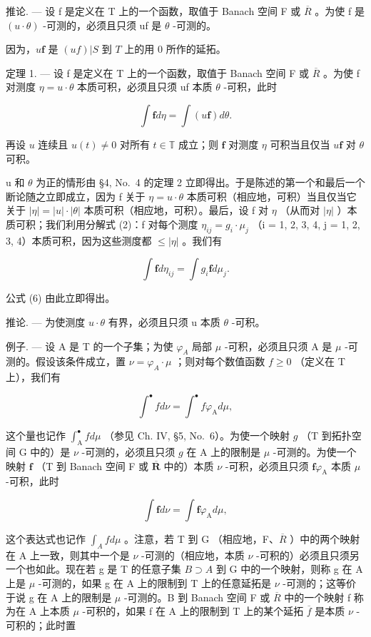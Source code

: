 推论. --- 设 f 是定义在 T 上的一个函数，取值于 Banach 空间 F 或 \(\overline{R}\) 。为使 f 是 \((u\cdot\theta)\) -可测的，必须且只须 uf 是 \(\theta\) -可测的。

因为，\(u\mathbf{f}\) 是 \((uf)|S\) 到 \(T\) 上的用 0 所作的延拓。

定理 1. --- 设 f 是定义在 T 上的一个函数，取值于 Banach 空间 F 或 \(\overline{R}\) 。为使 f 对测度 \(\eta = u\cdot \theta\) 本质可积，必须且只须 uf 本质 \(\theta\) -可积，此时

\[
\int \mathbf {f} d \eta = \int (u \mathbf {f}) d \theta .\tag{6}
\]

再设 \(u\) 连续且 \(u(t) \neq 0\) 对所有 \(t \in \mathbb{T}\) 成立；则 \(\mathbf{f}\) 对测度 \(\eta\) 可积当且仅当 \(u\mathbf{f}\) 对 \(\theta\) 可积。

u 和 \(\theta\) 为正的情形由 §4, No.~4 的定理 2 立即得出。于是陈述的第一个和最后一个断论随之立即成立，因为 f 关于 \(\eta = u \cdot \theta\) 本质可积（相应地，可积）当且仅当它关于 \(|\eta| = |u| \cdot |\theta|\) 本质可积（相应地，可积）。最后，设 f 对 \(\eta\) （从而对 \(|\eta|\) ）本质可积；我们利用分解式 (2)：f 对每个测度 \(\eta_{ij} = g_i \cdot \mu_j\) （i = 1, 2, 3, 4, j = 1, 2, 3, 4）本质可积，因为这些测度都 \(\leqslant |\eta|\) 。我们有

\[
\int \mathbf {f} d \eta_ {i j} = \int g _ {i} \mathbf {f} d \mu_ {j}.
\]

公式 (6) 由此立即得出。

推论. --- 为使测度 \(u \cdot \theta\) 有界，必须且只须 u 本质 \(\theta\) -可积。

例子. --- 设 A 是 T 的一个子集；为使 \(\varphi_{A}\) 局部 \(\mu\) -可积，必须且只须 A 是 \(\mu\) -可测的。假设该条件成立，置 \(\nu = \varphi_{A} \cdot \mu\) ；则对每个数值函数 \(f \geqslant 0\) （定义在 T 上），我们有

\[
\int^ {\bullet} f d \nu = \int^ {\bullet} f \varphi_ {\mathrm{A}} d \mu ,
\]

这个量也记作 \(\int_{\mathrm{A}}^{\bullet}f d\mu\) （参见 Ch. IV, §5, No.~6）。为使一个映射 \(g\) （T 到拓扑空间 G 中的）是 \(\nu\) -可测的，必须且只须 \(g\) 在 A 上的限制是 \(\mu\) -可测的。为使一个映射 \(\mathbf{f}\) （T 到 Banach 空间 F 或 \(\overline{\mathbf{R}}\) 中的）本质 \(\nu\) -可积，必须且只须 \(\mathbf{f}\varphi_{\mathrm{A}}\) 本质 \(\mu\) -可积，此时

\[
\int \mathbf {f} d \nu = \int \mathbf {f} \varphi_ {\mathrm{A}} d \mu ,
\]

这个表达式也记作 \(\int_{A} f d\mu\) 。注意，若 T 到 G （相应地，F、\(\overline{R}\) ）中的两个映射在 A 上一致，则其中一个是 \(\nu\) -可测的（相应地，本质 \(\nu\) -可积的）必须且只须另一个也如此。现在若 g 是 T 的任意子集 \(B \supset A\) 到 G 中的一个映射，则称 g 在 A 上是 \(\mu\) -可测的，如果 g 在 A 上的限制到 T 上的任意延拓是 \(\nu\) -可测的；这等价于说 g 在 A 上的限制是 \(\mu\) -可测的。B 到 Banach 空间 F 或 \(\overline{R}\) 中的一个映射 f 称为在 A 上本质 \(\mu\) -可积的，如果 f 在 A 上的限制到 T 上的某个延拓 \(\overline{f}\) 是本质 \(\nu\) -可积的；此时置

